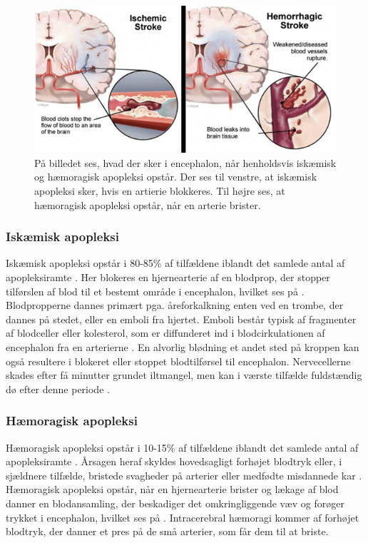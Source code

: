 \begin{figure}[H]
	\centering
	\includegraphics[scale=0.8]{figures/bProblemanalyse/haemoragisk_og_iskaemisk.png}
	\caption{På billedet ses, hvad der sker i encephalon, når henholdsvis iskæmisk og hæmoragisk apopleksi opstår. Der ses til venstre, at iskæmisk apopleksi sker, hvis en artierie blokkeres. Til højre ses, at hæmoragisk apopleksi opstår, når en arterie brister.\cite{Ritter2015}}
	\label{haem-isk}
\end{figure}

\subsubsection{Iskæmisk apopleksi}
Iskæmisk apopleksi opstår i 80-85\% af tilfældene iblandt det samlede antal af apopleksiramte \cite{Sundhed.dk2014}. Her blokeres en hjernearterie af en blodprop, der stopper tilførslen af blod til et bestemt område i encephalon, hvilket ses på . Blodpropperne dannes primært pga. åreforkalkning enten ved en trombe, der dannes på stedet, eller en emboli fra hjertet. \cite{Schulze2011} Emboli består typisk af fragmenter af blodceller eller kolesterol, som er diffunderet ind i blodcirkulationen af encephalon fra en arterierne \cite{Academic2015a}. En alvorlig blødning et andet sted på kroppen kan også resultere i blokeret eller stoppet blodtilførsel til encephalon. \cite{Hjernesagen2015a} Nervecellerne skades efter få minutter grundet iltmangel, men kan i værste tilfælde fuldstændig dø efter denne periode \cite{Schulze2011,Giraldo2015}.%

\subsubsection{Hæmoragisk apopleksi}
Hæmoragisk apopleksi opstår i 10-15\% af tilfældene iblandt det samlede antal af apopleksiramte \cite{Sundhed.dk2014}. Årsagen heraf skyldes hovedsagligt forhøjet blodtryk eller, i sjældnere tilfælde, bristede svagheder på arterier eller medfødte misdannede kar \cite{Schulze2011}. Hæmoragisk apopleksi opstår, når en hjernearterie brister og lækage af blod danner en blodansamling, der beskadiger det omkringliggende væv og forøger trykket i encephalon, hvilket ses på . Intracerebral hæmoragi kommer af forhøjet blodtryk, der danner et pres på de små arterier, som får dem til at briste. \cite{Caplan2006}

